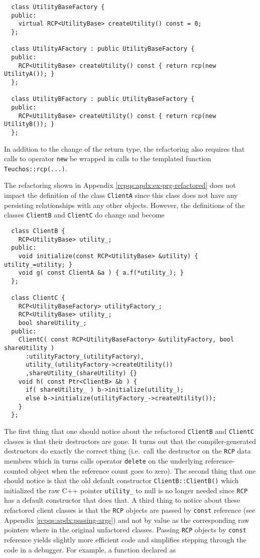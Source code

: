 \documentclass[pdf,ps2pdf,11pt]{SANDreport}
\begin{document}
{\small\begin{verbatim}
  class UtilityBaseFactory {
  public:
    virtual RCP<UtilityBase> createUtility() const = 0;
  };
  
  class UtilityAFactory : public UtilityBaseFactory {
  public:
    RCP<UtilityBase> createUtility() const { return rcp(new UtilityA()); }
  };
  
  class UtilityBFactory : public UtilityBaseFactory {
  public:
    RCP<UtilityBase> createUtility() const { return rcp(new UtilityB()); }
  };
\end{verbatim}}

In addition to the change of the return type, the refactoring also
requires that calls to operator {}\texttt{new} be wrapped in calls to
the templated function {}\texttt{Teuchos\-::rcp(...)}.

The refactoring shown in Appendix {}\ref{rcpqs:apdx:ex-prg-refactored}
does not impact the definition of the class {}\texttt{ClientA} since
this class does not have any persisting relationships with any
other objects.  However, the definitions of the classes
{}\texttt{ClientB} and {}\texttt{ClientC} do change and become

{\small\begin{verbatim}
  class ClientB {
    RCP<UtilityBase> utility_;
  public:
    void initialize(const RCP<UtilityBase> &utility) { utility_=utility; }
    void g( const ClientA &a ) { a.f(*utility_); }
  };
  
  class ClientC {
    RCP<UtilityBaseFactory> utilityFactory_;
    RCP<UtilityBase> utility_;
    bool shareUtility_;
  public:
    ClientC( const RCP<UtilityBaseFactory> &utilityFactory, bool shareUtility )
      :utilityFactory_(utilityFactory),
      utility_(utilityFactory->createUtility())
      ,shareUtility_(shareUtility) {}
    void h( const Ptr<ClientB> &b ) {
      if( shareUtility_ ) b->initialize(utility_);
      else b->initialize(utilityFactory_->createUtility());
    }
  };
\end{verbatim}}

The first thing that one should notice about the refactored
{}\texttt{ClientB} and {}\texttt{ClientC} classes is that their
destructors are gone.  It turns out that the compiler-generated
destructors do exactly the correct thing (i.e.~call the destructor on
the {}\texttt{RCP} data members which in turns calls
operator {}\texttt{delete} on the underlying reference-counted object
when the reference count goes to zero).  The second thing that one
should notice is that the old default constructor
{}\texttt{ClientB::ClientB()} which initialized the raw C++ pointer
{}\texttt{utility\_} to null is no longer needed since
{}\texttt{RCP} has a default constructor that does that.
A third thing to notice about these refactored client classes is that
the {}\texttt{RCP} objects are passed by
{}\texttt{const} reference (see Appendix
{}\ref{rcpqs:apdx:passing-args}) and not by value as the corresponding
raw pointers where in the original unfactored classes.  Passing
{}\texttt{RCP} objects by {}\texttt{const} reference
yields slightly more efficient code and simplifies stepping through
the code in a debugger.  For example, a function declared as
\end{document}

